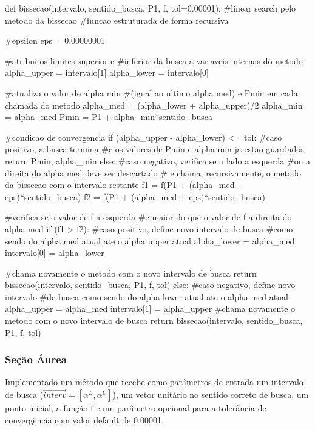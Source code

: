 \documentclass[10pt, a4paper]{article}
\begin{document}
\begin{python}

  def bissecao(intervalo, sentido_busca, P1, f, tol=0.00001):
    #linear search pelo metodo da bissecao
    #funcao estruturada de forma recursiva
    
    #epsilon
    eps = 0.00000001
    
    #atribui os limites superior e
    #inferior da busca a variaveis internas do metodo
    alpha_upper = intervalo[1]
    alpha_lower = intervalo[0]
    
    #atualiza o valor de alpha min
    #(igual ao ultimo alpha med) e  Pmin em cada chamada do metodo
    alpha_med = (alpha_lower + alpha_upper)/2
    alpha_min = alpha_med
    Pmin = P1 + alpha_min*sentido_busca    
    
    #condicao de convergencia
    if (alpha_upper - alpha_lower) <= tol:
        #caso positivo, a busca termina
        #e os valores de Pmin e alpha min ja estao guardados
        return Pmin, alpha_min
    else:
        #caso negativo, verifica se o lado a esquerda
        #ou a direita do alpha med deve ser descartado
        # e chama, recursivamente, o metodo da bissecao com o intervalo restante
        f1 = f(P1 + (alpha_med - eps)*sentido_busca)
        f2 = f(P1 + (alpha_med + eps)*sentido_busca)
        
        #verifica se o valor de f a esquerda
        #e maior do que o valor de f a direita do alpha med
        if (f1 > f2):
            #caso positivo, define novo intervalo de busca
            #como sendo do alpha med atual ate o alpha upper atual
            alpha_lower = alpha_med
            intervalo[0] = alpha_lower
            
            #chama novamente o metodo com o novo intervalo de busca
            return  bissecao(intervalo, sentido_busca, P1, f, tol)
        else:
            #caso negativo, define novo intervalo
            #de busca como sendo do alpha lower atual ate o alpha med atual
            alpha_upper = alpha_med
            intervalo[1] = alpha_upper 
            #chama novamente o metodo com o novo intervalo de busca           
            return  bissecao(intervalo, sentido_busca, P1, f, tol)  
\end{python}

\subsubsection{Seção Áurea}

Implementado um método que recebe como parâmetros de entrada um intervalo de busca
($\overrightarrow{interv} = [\alpha^L, \alpha^U]$), um vetor unitário no sentido correto
de busca, um ponto inicial, a função f e um parâmetro opcional para a tolerância de convergência com valor default de 0.00001.
\end{document}
